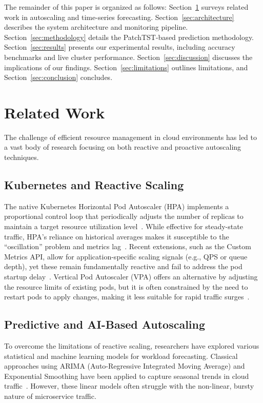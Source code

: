 \documentclass[conference]{IEEEtran}
\begin{document}
The remainder of this paper is organized as follows: Section~\ref{sec:related} surveys related work in autoscaling and time-series forecasting. Section~\ref{sec:architecture} describes the system architecture and monitoring pipeline. Section~\ref{sec:methodology} details the PatchTST-based prediction methodology. Section~\ref{sec:results} presents our experimental results, including accuracy benchmarks and live cluster performance. Section~\ref{sec:discussion} discusses the implications of our findings. Section~\ref{sec:limitations} outlines limitations, and Section~\ref{sec:conclusion} concludes.

\section{Related Work}\label{sec:related}

The challenge of efficient resource management in cloud environments has led to a vast body of research focusing on both reactive and proactive autoscaling techniques.

\subsection{Kubernetes and Reactive Scaling}
The native Kubernetes Horizontal Pod Autoscaler (HPA) implements a proportional control loop that periodically adjusts the number of replicas to maintain a target resource utilization level~\cite{k8s_hpa}. While effective for steady-state traffic, HPA's reliance on historical averages makes it susceptible to the ``oscillation'' problem and metrics lag~\cite{lorido2014review}. Recent extensions, such as the Custom Metrics API, allow for application-specific scaling signals (e.g., QPS or queue depth), yet these remain fundamentally reactive and fail to address the pod startup delay~\cite{baarzi2021showar}. Vertical Pod Autoscaler (VPA) offers an alternative by adjusting the resource limits of existing pods, but it is often constrained by the need to restart pods to apply changes, making it less suitable for rapid traffic surges~\cite{rzadca2020autopilot}.

\subsection{Predictive and AI-Based Autoscaling}
To overcome the limitations of reactive scaling, researchers have explored various statistical and machine learning models for workload forecasting. Classical approaches using ARIMA (Auto-Regressive Integrated Moving Average) and Exponential Smoothing have been applied to capture seasonal trends in cloud traffic~\cite{yan2021hansel}. However, these linear models often struggle with the non-linear, bursty nature of microservice traffic.
\end{document}
